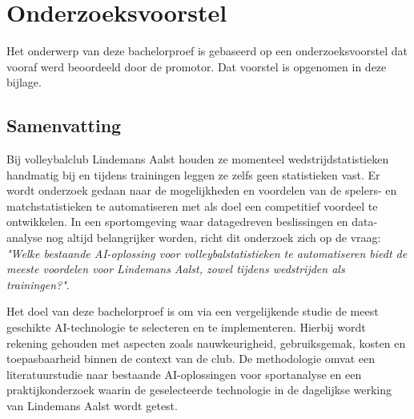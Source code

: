\documentclass[dutch,dit,thesis]{hogentreport}
\begin{document}





%
%







\appendix

\chapter{Onderzoeksvoorstel}

Het onderwerp van deze bachelorproef is gebaseerd op een onderzoeksvoorstel dat vooraf werd beoordeeld door de promotor. Dat voorstel is opgenomen in deze bijlage.

\section{Samenvatting}

Bij volleybalclub Lindemans Aalst houden ze momenteel wedstrijdstatistieken handmatig bij en tijdens trainingen leggen ze zelfs geen statistieken vast. Er wordt onderzoek gedaan naar de mogelijkheden en voordelen van de spelers- en matchstatistieken te automatiseren met als doel een competitief voordeel te ontwikkelen. In een sportomgeving waar datagedreven beslissingen en data-analyse nog altijd belangrijker worden, richt dit onderzoek zich op de vraag: \textit{"Welke bestaande AI-oplossing voor volleybalstatistieken te automatiseren biedt de meeste voordelen voor Lindemans Aalst, zowel tijdens wedstrijden als trainingen?"}.
  
Het doel van deze bachelorproef is om via een vergelijkende studie de meest geschikte AI-technologie te selecteren en te implementeren. Hierbij wordt rekening gehouden met aspecten zoals nauwkeurigheid, gebruiksgemak, kosten en toepasbaarheid binnen de context van de club. De methodologie omvat een literatuurstudie naar bestaande AI-oplossingen voor sportanalyse en een praktijkonderzoek waarin de geselecteerde technologie in de dagelijkse werking van Lindemans Aalst wordt getest.
\end{document}
